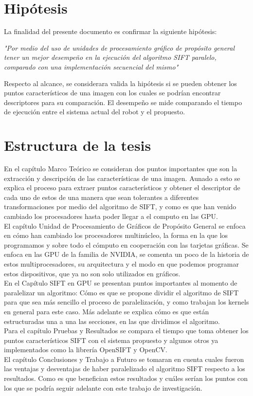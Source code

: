\section{Hipótesis} 
La finalidad del presente documento es  confirmar la siguiente hipótesis:
\begin{center}
\textit{"Por medio del uso de unidades de procesamiento gráfico de propósito general tener un mejor desempeño en la ejecución del algoritmo SIFT paralelo, comparado con una implementación secuencial del mismo"}
\end{center}
Respecto al alcance, se considerara valida la hipótesis si se pueden obtener los puntos característicos de una imagen con los cuales se podrían encontrar descriptores para su comparación. El desempeño se mide comparando el tiempo de ejecución entre el sistema actual del robot y el propuesto.\\

\section{Estructura de la tesis}
En el capítulo Marco Teórico se consideran dos puntos importantes que son la extracción y descripción de las características de una imagen. Aunado a esto  se explica el proceso para extraer puntos característicos y obtener el descriptor de cada uno de estos de una manera que sean tolerantes a diferentes transformaciones por medio del algoritmo de SIFT, y como es que han venido cambiado los procesadores hasta poder llegar a el computo en las GPU.\\
El capítulo Unidad de Procesamiento de Gráficos de Propósito General  se enfoca en cómo han cambiado los procesadores multinúcleo, la forma en la que los programamos y sobre todo el cómputo en cooperación con las tarjetas gráficas. Se enfoca en las GPU de la familia de NVIDIA, se comenta un poco de la historia de estos multiprocesadores, su arquitectura y el modo en que podemos programar estos dispositivos, que ya no son solo utilizados en gráficos.\\
En el Capítulo SIFT en GPU se presentan puntos importantes al momento de paralelizar un algoritmo: Cómo es que se propone dividir el algoritmo de SIFT para que sea más sencillo el proceso de paralelización, y como trabajan los kernels en general para este caso. Más adelante se explica cómo es que están estructuradas una a una las secciones, en las que dividimos el algoritmo.\\
Para el capítulo Pruebas y Resultados se compara el tiempo que toma obtener los puntos característicos SIFT con el sistema propuesto y algunos otros ya implementados como la librería OpenSIFT y OpenCV.\\
El capítulo Conclusiones y Trabajo a Futuro se tomaran en cuenta cuales fueron las ventajas y desventajas de haber paralelizado el algoritmo SIFT respecto a los resultados. Como es que benefician estos resultados y cuáles serían los puntos con los que se podría seguir adelante con este trabajo de investigación.  \\






